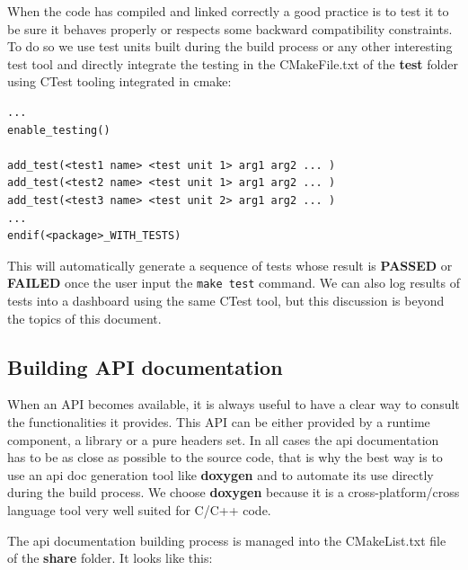 \documentclass[12pt,a4paper]{article}
\begin{document}
When the code has compiled and linked correctly a good practice is to test it to be sure it behaves properly or respects some backward compatibility constraints. To do so we use test units built during the build process or any other interesting test tool and directly integrate the testing in the CMakeFile.txt of the \textbf{test} folder using CTest tooling integrated in cmake:

\begin{verbatim}
...
enable_testing()

add_test(<test1 name> <test unit 1> arg1 arg2 ... )
add_test(<test2 name> <test unit 1> arg1 arg2 ... )
add_test(<test3 name> <test unit 2> arg1 arg2 ... )
...
endif(<package>_WITH_TESTS)
\end{verbatim}

This will automatically generate a sequence of tests whose result is \textbf{PASSED} or \textbf{FAILED} once the user input the \texttt{make test} command. We can also log results of tests into a dashboard using the same CTest tool, but this discussion is beyond the topics of this document.

\subsection{Building API documentation}

When an API becomes available, it is always useful to have a clear way to consult the functionalities it provides. This API can be either provided by a runtime component, a library or a pure headers set. In all cases the api documentation has to be as close as possible to the source code, that is why the best way is to use an api doc generation tool like \textbf{doxygen} and to automate its use directly during the build process. We choose \textbf{doxygen} because it is a cross-platform/cross language tool very well suited for C/C++ code.

The api documentation building process is managed into the CMakeList.txt file of the \textbf{share} folder. It looks like this:
\end{document}
